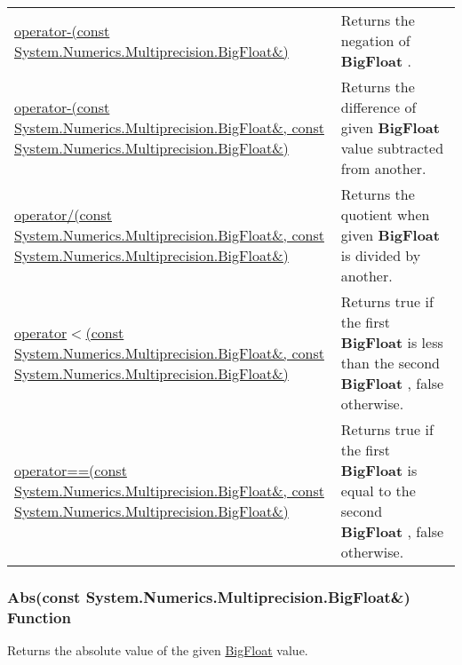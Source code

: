 \documentclass[a4paper,oneside,11.000000pt]{book}
\begin{document}
\begin{flushleft}
\begin{supertabular}[l]{!{\raggedright}p{7.575cm}!{\raggedright}p{7.575cm}}
\\
\hyperlink{System.Numerics.Multiprecision.operator.minus.C.R.System.Numerics.Multiprecision.BigFloat}{operator-(const System.\-Numerics.\-Multiprecision.\-BigFloat\&\-)}
& Returns the negation of \textbf{BigFloat}
.

\\
\hyperlink{System.Numerics.Multiprecision.operator.minus.C.R.System.Numerics.Multiprecision.BigFloat.C.R.System.Numerics.Multiprecision.BigFloat}{operator-(const System.\-Numerics.\-Multiprecision.\-BigFloat\&\-, const System.\-Numerics.\-Multiprecision.\-BigFloat\&\-)}
& Returns the difference of given \textbf{BigFloat}
 value subtracted from another.

\\
\hyperlink{System.Numerics.Multiprecision.operator.divides.C.R.System.Numerics.Multiprecision.BigFloat.C.R.System.Numerics.Multiprecision.BigFloat}{operator/(const System.\-Numerics.\-Multiprecision.\-BigFloat\&\-, const System.\-Numerics.\-Multiprecision.\-BigFloat\&\-)}
& Returns the quotient when given \textbf{BigFloat}
 is divided by another.

\\
\hyperlink{System.Numerics.Multiprecision.operator.less.C.R.System.Numerics.Multiprecision.BigFloat.C.R.System.Numerics.Multiprecision.BigFloat}{operator$<$\-(const System.\-Numerics.\-Multiprecision.\-BigFloat\&\-, const System.\-Numerics.\-Multiprecision.\-BigFloat\&\-)}
& Returns true if the first \textbf{BigFloat}
 is less than the second \textbf{BigFloat}
, false otherwise.

\\
\hyperlink{System.Numerics.Multiprecision.operator.equal.C.R.System.Numerics.Multiprecision.BigFloat.C.R.System.Numerics.Multiprecision.BigFloat}{operator==(const System.\-Numerics.\-Multiprecision.\-BigFloat\&\-, const System.\-Numerics.\-Multiprecision.\-BigFloat\&\-)}
& Returns true if the first \textbf{BigFloat}
 is equal to the second \textbf{BigFloat}
, false otherwise.

\\
\end{supertabular}

\end{flushleft}
\clearpage

\hypertarget{System.Numerics.Multiprecision.Abs.C.R.System.Numerics.Multiprecision.BigFloat}{\subsubsection*{Abs(const System.Numerics.Multiprecision.BigFloat\&) Function}}
\begin{flushleft}
Returns the absolute value of the given \hyperlink{System.Numerics.Multiprecision.BigFloat}{BigFloat} value.

\end{flushleft}
\end{document}
